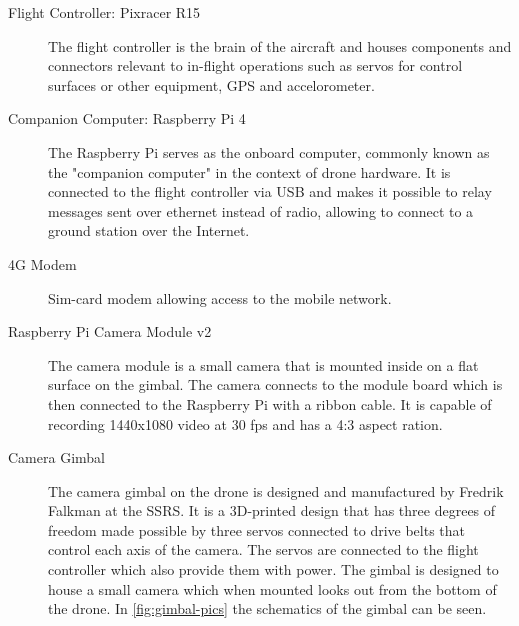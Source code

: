 \documentclass[nofilelist]{cslthse-msc}
\begin{document}
\begin{description}
   \item[Flight Controller: Pixracer R15] The flight controller is the brain of the aircraft and houses components and connectors relevant to in-flight operations such as servos for control surfaces or other equipment, GPS and accelorometer.

   \item[Companion Computer: Raspberry Pi 4] The Raspberry Pi serves as the onboard computer, commonly known as the "companion computer" in the context of drone hardware. It is connected to the flight controller via USB and makes it possible to relay messages sent over ethernet instead of radio, allowing to connect to a ground station over the Internet. 
   
   \item[4G Modem] Sim-card modem allowing access to the mobile network. 
   
   \item[Raspberry Pi Camera Module v2] The camera module is a small camera that is mounted inside on a flat surface on the gimbal. The camera connects to the module board which is then connected to the Raspberry Pi with a ribbon cable. It is capable of recording 1440x1080 video at 30 fps and has a 4:3 aspect ration. 

   \item[Camera Gimbal] The camera gimbal on the drone is designed and manufactured by Fredrik Falkman at the SSRS. It is a 3D-printed design that has three degrees of freedom made possible by three servos connected to drive belts that control each axis of the camera. The servos are connected to the flight controller which also provide them with power. The gimbal is designed to house a small camera which when mounted looks out from the bottom of the drone. In \ref{fig:gimbal-pics} the schematics of the gimbal can be seen. 
   

\end{description}
\end{document}
